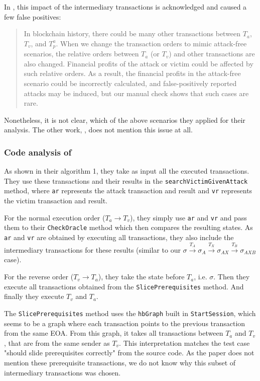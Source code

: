 \documentclass[draft,final]{vutinfth} %
\begin{document}
In \cite{zhang_combatting_2023}, this impact of the intermediary transactions is acknowledged and caused a few false positives:

\begin{quote}
    In blockchain history, there could be many other transactions between $T_a$, $T_v$, and $T_p^a$. When we change the transaction orders to mimic attack-free scenarios, the relative orders between $T_a$ (or $T_v$) and other transactions are also changed. Financial profits of the attack or victim could be affected by such relative orders. As a result, the financial profits in the attack-free scenario could be incorrectly calculated, and false-positively reported attacks may be induced, but our manual check shows that such cases are rare.
\end{quote}

Nonetheless, it is not clear, which of the above scenarios they applied for their analysis. The other work, \cite{torres_frontrunner_2021}, does not mention this issue at all.


\subsubsection{Code analysis of \cite{zhang_combatting_2023}}


As shown in their algorithm 1, they take as input all the executed transactions. They use these transactions and their results in the \verb|searchVictimGivenAttack| method, where \verb|ar| represents the attack transaction and result and \verb|vr| represents the victim transaction and result.

For the normal execution order ($T_a \rightarrow T_v$), they simply use \verb|ar| and \verb|vr| and pass them to their \verb|CheckOracle| method which then compares the resulting states. As \verb|ar| and \verb|vr| are obtained by executing all transactions, they also include the intermediary transactions for these results (similar to our $\sigma \xrightarrow{T_A} \sigma_A \xrightarrow{T_X} \sigma_{AX} \xrightarrow{T_B} \sigma_{AXB}$ case).

For the reverse order ($T_v \rightarrow T_a$), they take the state before $T_a$, i.e. $\sigma$. Then they execute all transactions obtained from the \verb|SlicePrerequisites| method. And finally they execute $T_v$ and $T_a$.

The \verb|SlicePrerequisites| method uses the \verb|hbGraph| built in \verb|StartSession|, which seems to be a graph where each transaction points to the previous transaction from the same EOA. From this graph, it takes all transactions between $T_a$ and $T_v$, that are from the same sender as $T_v$. This interpretation matches the test case "should slide prerequisites correctly" from the source code. As the paper does not mention these prerequisite transactions, we do not know why this subset of intermediary transactions was chosen.
\end{document}
